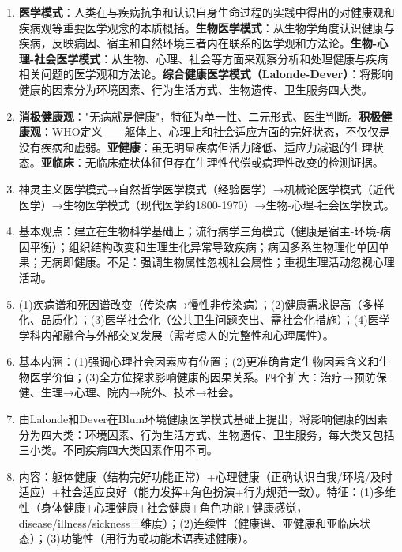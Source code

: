 \begin{enumerate}[leftmargin=*, itemsep=5pt]
    \item \textbf{医学模式}：人类在与疾病抗争和认识自身生命过程的实践中得出的对健康观和疾病观等重要医学观念的本质概括。\textbf{生物医学模式}：从生物学角度认识健康与疾病，反映病因、宿主和自然环境三者内在联系的医学观和方法论。\textbf{生物-心理-社会医学模式}：从生物、心理、社会等方面来观察分析和处理健康与疾病相关问题的医学观和方法论。\textbf{综合健康医学模式（Lalonde-Dever）}：将影响健康的因素分为环境因素、行为生活方式、生物遗传、卫生服务四大类。
    \item \textbf{消极健康观}："无病就是健康"，特征为单一性、二元形式、医生判断。\textbf{积极健康观}：WHO定义——躯体上、心理上和社会适应方面的完好状态，不仅仅是没有疾病和虚弱。\textbf{亚健康}：虽无明显疾病但活力降低、适应力减退的生理状态。\textbf{亚临床}：无临床症状体征但存在生理性代偿或病理性改变的检测证据。
    \item 神灵主义医学模式→自然哲学医学模式（经验医学）→机械论医学模式（近代医学）→生物医学模式（现代医学约1800-1970）→生物-心理-社会医学模式。
    \item 基本观点：建立在生物科学基础上；流行病学三角模式（健康是宿主-环境-病因平衡）；组织结构改变和生理生化异常导致疾病；病因多系生物理化单因单果；无病即健康。不足：强调生物属性忽视社会属性；重视生理活动忽视心理活动。
    \item (1)疾病谱和死因谱改变（传染病→慢性非传染病）；(2)健康需求提高（多样化、品质化）；(3)医学社会化（公共卫生问题突出、需社会化措施）；(4)医学学科内部融合与外部交叉发展（需考虑人的完整性和心理属性）。
    \item 基本内涵：(1)强调心理社会因素应有位置；(2)更准确肯定生物因素含义和生物医学价值；(3)全方位探求影响健康的因果关系。四个扩大：治疗→预防保健、生理→心理、院内→院外、技术→社会。
    \item 由Lalonde和Dever在Blum环境健康医学模式基础上提出，将影响健康的因素分为四大类：环境因素、行为生活方式、生物遗传、卫生服务，每大类又包括三小类。不同疾病四大类因素作用不同。
    \item 内容：躯体健康（结构完好功能正常）+心理健康（正确认识自我/环境/及时适应）+社会适应良好（能力发挥+角色扮演+行为规范一致）。特征：(1)多维性（身体健康+心理健康+社会健康+角色功能+健康感觉，disease/illness/sickness三维度）；(2)连续性（健康谱、亚健康和亚临床状态）；(3)功能性（用行为或功能术语表述健康）。
\end{enumerate}

\newpage
